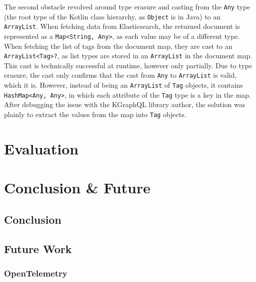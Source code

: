 \documentclass[12pt,pdftex,titlepage]{report}
\begin{document}
                    The second obstacle revolved around type erasure and casting from the \texttt{Any} type (the root type of the Kotlin class hierarchy, as \texttt{Object} is in Java) to an \texttt{ArrayList}. When fetching data from 
                    Elasticsearch, the returned document is represented as a \texttt{Map<String, Any>}, as each value may be of a different type. When fetching the list of tags from the document map, they are cast to an 
                    \texttt{ArrayList<Tag>?}, as list types are stored in an \texttt{ArrayList} in the document map. This cast is technically successful at runtime, however only partially. Due to type erasure, the cast only 
                    confirms that the cast from \texttt{Any} to \texttt{ArrayList} is valid, which it is. However, instead of being an \texttt{ArrayList} of \texttt{Tag} objects, it contains \texttt{HashMap<Any, Any>}, in which 
                    each attribute of the \texttt{Tag} type is a key in the map. After debugging the issue with the KGraphQL library author, the solution was plainly to extract the values from the map into \texttt{Tag} objects.
            

    \chapter{Evaluation}


    
    \chapter{Conclusion \& Future}
        \section{Conclusion}

        \section{Future Work}
            \subsection{OpenTelemetry}
\end{document}
